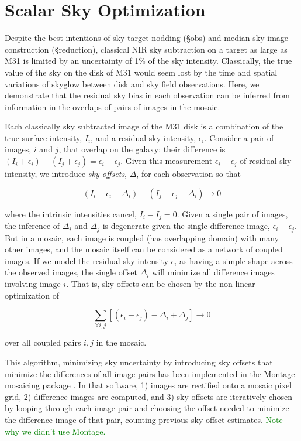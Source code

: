 \documentclass[iop]{emulateapj}
\newcommand{\todo}[1]{\textcolor{green}{#1}}
\begin{document}

\section{Scalar Sky Optimization}

Despite the best intentions of sky-target nodding (\S obs) and median sky image construction (\S reduction), classical NIR sky subtraction on a target as large as M31 is limited by an uncertainty of 1\% of the sky intensity. Classically, the true value of the sky on the disk of M31 would seem lost by the time and spatial variations of skyglow between disk and sky field observations. Here, we demonstrate that the residual sky bias in each observation can be inferred from information in the overlaps of pairs of images in the mosaic.

Each classically sky subtracted image of the M31 disk is a combination of the true surface intensity, $I_i$, and a residual sky intensity, $\epsilon_i$. Consider a pair of images, $i$ and $j$, that overlap on the galaxy: their difference is $(I_i+\epsilon_i) - (I_j+\epsilon_j) = \epsilon_i - \epsilon_j$. Given this measurement $\epsilon_i - \epsilon_j$ of residual sky intensity, we introduce \emph{sky offsets}, $\Delta$, for each observation so that

\begin{equation}
    (I_i + \epsilon_i - \Delta_i) - (I_j + \epsilon_j - \Delta_i) \rightarrow 0
\end{equation}

\noindent where the intrinsic intensities cancel, $I_i - I_j = 0$. Given a single pair of images, the inference of $\Delta_i$ and $\Delta_j$ is degenerate given the single difference image, $\epsilon_i-\epsilon_j$. But in a mosaic, each image is coupled (has overlapping domain) with many other images, and the mosaic itself can be considered as a network of coupled images. If we model the residual sky intensity $\epsilon_i$ as having a simple shape across the observed images, the single offset $\Delta_i$ will minimize all difference images involving image $i$. That is, sky offsets can be chosen by the non-linear optimization of

\begin{equation}
    \sum_{\forall i,j} [(\epsilon_i - \epsilon_j) - \Delta_i + \Delta_j] \rightarrow 0
\end{equation}

\noindent over all coupled pairs $i,j$ in the mosaic.

This algorithm, minimizing sky uncertainty by introducing sky offsets that minimize the differences of all image pairs has been implemented in the Montage mosaicing package
\citep{Berriman:2008}. In that software, 1) images are rectified onto a mosaic pixel grid, 2) difference images are computed, and 3) sky offsets are iteratively chosen by looping through each image pair and choosing the offset needed to minimize the difference image of that pair, counting previous sky offset estimates. \todo{Note why we didn't use Montage.}




\end{document}
